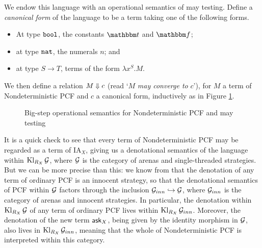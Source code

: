 We endow this language with an operational semantics of may testing.  
Define a \emph{canonical form} of the language to be a term taking one of the following forms.
\begin{itemize}
  \item At type ${\mathtt{bool}}$, the constants $\true$ and $\false$;
  \item at type ${\mathtt{nat}}$, the numerals $n$; and
  \item at type $S \to T$, terms of the form $\lambda x^S.M$.
\end{itemize}
We then define a relation $M \Downarrow c$ (read `$M$ \emph{may converge to} $c$'), for $M$ a term of Nondeterministic PCF and $c$ a canonical form, inductively as in Figure \ref{FigNDPCFOpSem}.
\begin{figure}
  \caption{Big-step operational semantics for Nondeterministic PCF and may testing}
  \label{FigNDPCFOpSem}
\end{figure}

It is a quick check to see that every term of Nondeterministic PCF may be regarded as a term of IA${}_X$, giving us a denotational semantics of the language within $\operatorname{Kl}_{R_X}\mathcal G$, where $\mathcal G$ is the category of arenas and single-threaded strategies.
But we can be more precise than this: we know from \cite{hoPcf} that the denotation of any term of ordinary PCF is an innocent strategy, so that the denotational semantics of PCF within $\mathcal G$ factors through the inclusion $\mathcal G_{inn}\hookrightarrow\mathcal G$, where $\mathcal G_{inn}$ is the category of arenas and innocent strategies.
In particular, the denotation within $\operatorname{Kl}_{R_X}\mathcal G$ of any term of ordinary PCF lives within $\operatorname{Kl}_{R_X}\mathcal G_{inn}$.
Moreover, the denotation of the new term $\operatorname{{\mathsf{ask}}}_X$, being given by the identity morphism in $\mathcal G$, also lives in $\operatorname{Kl}_{R_X}\mathcal G_{inn}$, meaning that the whole of Nondeterministic PCF is interpreted within this category.

